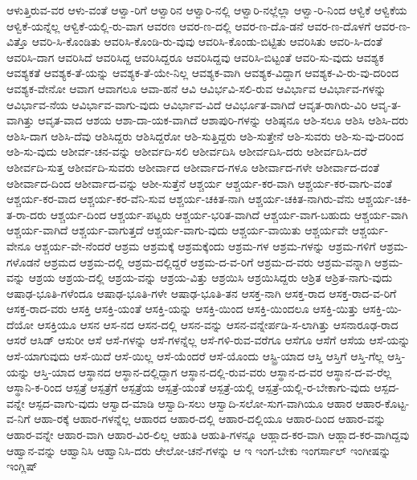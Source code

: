 {ಆಳುತ್ತಿರುವ-ವರ
ಆಳು-ವಂತೆ
ಆಳ್ವಾ-ರಿಗೆ
ಆಳ್ವಾರಿನ
ಆಳ್ವಾರಿ-ನಲ್ಲಿ
ಆಳ್ವಾರಿ-ನಲ್ಲೆಲ್ಲಾ
ಆಳ್ವಾ-ರಿ-ನಿಂದ
ಆಳ್ವಿಕೆ
ಆಳ್ವಿಕೆಯ
ಆಳ್ವಿಕೆ-ಯನ್ನೆಲ್ಲ
ಆಳ್ವಿಕೆ-ಯಲ್ಲಿ-ರು-ವಾಗ
ಆವರಣ
ಆವರ-ಣ-ದಲ್ಲಿ
ಆವರ-ಣ-ದೊ-ಡನೆ
ಆವರ-ಣ-ದೊಳಗೆ
ಆವರ-ಣ-ವಿತ್ತೊ
ಆವರಿ-ಸಿ-ಕೊಂಡಿತು
ಆವರಿಸಿ-ಕೊಂಡಿ-ರು-ವುವು
ಆವರಿಸಿ-ಕೊಂಡು-ಬಿಟ್ಟಿತು
ಆವರಿಸಿತು
ಆವರಿ-ಸಿ-ದಂತೆ
ಆವರಿಸಿ-ದಾಗ
ಆವರಿಸಿದೆ
ಆವರಿಸಿದ್ದ
ಆವರಿಸಿದ್ದರೂ
ಆವರಿಸಿದ್ದವು
ಆವರಿಸಿ-ಬಿಟ್ಟಂತೆ
ಆವರಿ-ಸು-ವುದು
ಆವಶ್ಯಕ
ಆವಶ್ಯಕತೆ
ಆವಶ್ಯಕ-ತೆ-ಯನ್ನು
ಆವಶ್ಯಕ-ತೆ-ಯೇ-ನಿಲ್ಲ
ಆವಶ್ಯಕ-ವಾಗಿ
ಆವಶ್ಯಕ-ವಿದ್ದಾಗ
ಆವಶ್ಯಕ-ವಿ-ರು-ವು-ದರಿಂದ
ಆವಶ್ಯಕ-ವೇನೋ
ಆವಾಗ
ಆವಾಗಲೂ
ಆವಾ-ಹನೆ
ಆವಿ
ಆವಿರ್ಭವಿ-ಸಲಿ-ರುವ
ಆವಿರ್ಭಾವ
ಆವಿರ್ಭಾವ-ಗಳನ್ನು
ಆವಿರ್ಭಾವ-ನೆಯ
ಆವಿರ್ಭಾವ-ವಾಗು-ವುದು
ಆವಿರ್ಭಾವ-ವಿದೆ
ಆವಿರ್ಭೂತ-ವಾಗಿದೆ
ಆವೃತ-ರಾಗಿರು-ವಿರಿ
ಆವೃ-ತ-ವಾಗಿತ್ತು
ಆವೃತ-ವಾದ
ಆಶಯ
ಆಶಾ-ದಾ-ಯಕ-ವಾಗಿದೆ
ಆಶಾಪುರಿ-ಗಳನ್ನು
ಆಶಿಷ್ಠನೂ
ಆಶಿ-ಸಲೂ
ಆಶಿಸಿ
ಆಶಿಸಿ-ದರು
ಆಶಿಸಿ-ದಾಗ
ಆಶಿಸಿ-ದೆವು
ಆಶಿಸಿದ್ದರು
ಆಶಿಸಿದ್ದರೋ
ಆಶಿ-ಸುತ್ತಿದ್ದರು
ಆಶಿ-ಸುತ್ತೇನೆ
ಆಶಿ-ಸುವರು
ಆಶಿ-ಸು-ವು-ದರಿಂದ
ಆಶಿ-ಸು-ವುದು
ಆಶೀರ್ವ-ಚನ-ವನ್ನು
ಆಶೀರ್ವದಿ-ಸಲಿ
ಆಶೀರ್ವದಿಸಿ
ಆಶೀರ್ವದಿಸಿ-ದರು
ಆಶೀರ್ವದಿಸಿ-ದರೆ
ಆಶೀರ್ವದಿ-ಸುತ್ತ
ಆಶೀರ್ವದಿ-ಸುವರು
ಆಶೀರ್ವಾದ
ಆಶೀರ್ವಾದ-ಗಳೂ
ಆಶೀರ್ವಾದ-ಗಳೇ
ಆಶೀರ್ವಾದ-ದಂತೆ
ಆಶೀರ್ವಾದ-ದಿಂದ
ಆಶೀರ್ವಾದ-ವನ್ನು
ಆಶೀ-ಸುತ್ತೆನೆ
ಆಶ್ಚರ್ಯ
ಆಶ್ಚರ್ಯ-ಕರ-ವಾಗಿ
ಆಶ್ಚರ್ಯ-ಕರ-ವಾಗು-ವಂತೆ
ಆಶ್ಚರ್ಯ-ಕರ-ವಾದ
ಆಶ್ಚರ್ಯ-ಕರ-ವೆನಿ-ಸುವ
ಆಶ್ಚರ್ಯ-ಚಕಿತ-ನಾಗಿ
ಆಶ್ಚರ್ಯ-ಚಕಿತ-ನಾಗಿರು-ವೆನು
ಆಶ್ಚರ್ಯ-ಚಕಿ-ತ-ರಾ-ದರು
ಆಶ್ಚರ್ಯ-ದಿಂದ
ಆಶ್ಚರ್ಯ-ಪಟ್ಟರು
ಆಶ್ಚರ್ಯ-ಭರಿತ-ವಾಗಿದೆ
ಆಶ್ಚರ್ಯ-ವಾಗ-ಬಹುದು
ಆಶ್ಚರ್ಯ-ವಾಗಿ
ಆಶ್ಚರ್ಯ-ವಾಗಿದೆ
ಆಶ್ಚರ್ಯ-ವಾಗುತ್ತದೆ
ಆಶ್ಚರ್ಯ-ವಾಗು-ವುದು
ಆಶ್ಚರ್ಯ-ವಾಯಿತು
ಆಶ್ಚರ್ಯವೇ
ಆಶ್ಚರ್ಯ-ವೇನೂ
ಆಶ್ಚರ್ಯ-ವೇ-ನೆಂದರೆ
ಆಶ್ರಮ
ಆಶ್ರಮಕ್ಕೆ
ಆಶ್ರಮಕ್ಕೆಂದು
ಆಶ್ರಮ-ಗಳ
ಆಶ್ರಮ-ಗಳನ್ನು
ಆಶ್ರಮ-ಗಳಿಗೆ
ಆಶ್ರಮ-ಗಳೊಡನೆ
ಆಶ್ರಮದ
ಆಶ್ರಮ-ದಲ್ಲಿ
ಆಶ್ರಮ-ದಲ್ಲಿದ್ದರೆ
ಆಶ್ರಮ-ದ-ವ-ರಿಗೆ
ಆಶ್ರಮ-ದ-ವರು
ಆಶ್ರಮ-ವನ್ನಾಗಿ
ಆಶ್ರಮ-ವನ್ನು
ಆಶ್ರಯ
ಆಶ್ರಯ-ದಲ್ಲಿ
ಆಶ್ರಯ-ವನ್ನು
ಆಶ್ರಯ-ವಿತ್ತು
ಆಶ್ರಯಿಸಿ
ಆಶ್ರಯಿಸಿದ್ದರು
ಆಶ್ರಿತ
ಆಶ್ರಿತ-ನಾಗು-ವುದು
ಆಷಾಢ-ಭೂತಿ-ಗಳೆಂದೂ
ಆಷಾಢ-ಭೂತಿ-ಗಳೇ
ಆಷಾಢ-ಭೂತಿ-ತನ
ಆಸಕ್ತ-ನಾಗಿ
ಆಸಕ್ತ-ರಾದ
ಆಸಕ್ತ-ರಾದ-ವ-ರಿಗೆ
ಆಸಕ್ತ-ರಾದ-ವರು
ಆಸಕ್ತಿ
ಆಸಕ್ತಿ-ಯಂತೆ
ಆಸಕ್ತಿ-ಯನ್ನು
ಆಸಕ್ತಿ-ಯಿಂದ
ಆಸಕ್ತಿ-ಯಿಂದಲೂ
ಆಸಕ್ತಿ-ಯಿತ್ತು
ಆಸಕ್ತಿ-ಯಿ-ದೆಯೋ
ಆಸಕ್ತಿಯೂ
ಆಸನ
ಆಸ-ನದ
ಆಸನ-ದಲ್ಲಿ
ಆಸನ-ವನ್ನು
ಆಸನ-ವನ್ನೇರ್ಪಡಿ-ಸ-ಲಾಗಿತ್ತು
ಆಸನಾರೂಢ-ರಾದ
ಆಸರೆ
ಆಸಿಡ್
ಆಸುರೀ
ಆಸೆ
ಆಸೆ-ಗಳನ್ನು
ಆಸೆ-ಗಳನ್ನೆಲ್ಲ
ಆಸೆ-ಗಳಿ-ರುವ-ವರೆಗೂ
ಆಸೆಗೂ
ಆಸೆಗೆ
ಆಸೆಯ
ಆಸೆ-ಯನ್ನು
ಆಸೆ-ಯಾಗುವುದು
ಆಸೆ-ಯಿದೆ
ಆಸೆ-ಯಿಲ್ಲ
ಆಸೆ-ಯೆಂದರೆ
ಆಸೆ-ಯೊಂದು
ಆಸ್ಟ್ರಿ-ಯಾದ
ಆಸ್ತಿ
ಆಸ್ತಿಗೆ
ಆಸ್ತಿ-ಗೆಲ್ಲ
ಆಸ್ತಿ-ಯನ್ನು
ಆಸ್ತಿ-ಯಾದ
ಆಸ್ಥಾನದ
ಆಸ್ಥಾನ-ದಲ್ಲಿದ್ದಾಗ
ಆಸ್ಥಾನ-ದಲ್ಲಿ-ರುವ-ವರು
ಆಸ್ಥಾನ-ದ-ವರ
ಆಸ್ಥಾನ-ದ-ವ-ರೆಲ್ಲ
ಆಸ್ಥಾನಿ-ಕ-ರಿಂದ
ಆಸ್ಪತ್ರೆ
ಆಸ್ಪತ್ರೆಗೆ
ಆಸ್ಪತ್ರೆಯ
ಆಸ್ಪತ್ರೆ-ಯಂತೆ
ಆಸ್ಪತ್ರೆ-ಯಲ್ಲಿ
ಆಸ್ಪತ್ರೆ-ಯಲ್ಲಿ-ರ-ಬೇಕಾಗು-ವುದು
ಆಸ್ಪದ-ವನ್ನೇ
ಆಸ್ಪದ-ವಾಗು-ವುದು
ಆಸ್ವಾದ-ಮಾಡಿ
ಆಸ್ವಾದಿ-ಸಲು
ಆಸ್ವಾದಿ-ಸಲೋ-ಸುಗ-ವಾಗಿಯೂ
ಆಹಾರ
ಆಹಾರ-ಕೊಟ್ಟ-ವ-ನಿಗೆ
ಆಹಾ-ರಕ್ಕೆ
ಆಹಾರ-ಗಳನ್ನೆಲ್ಲ
ಆಹಾರದ
ಆಹಾರ-ದಲ್ಲಿ
ಆಹಾರ-ದಲ್ಲಿಯೂ
ಆಹಾರ-ದಿಂದ
ಆಹಾರ-ವನ್ನು
ಆಹಾರ-ವನ್ನೇ
ಆಹಾರ-ವಾಗಿ
ಆಹಾರ-ವಿರ-ಲಿಲ್ಲ
ಆಹುತಿ
ಆಹುತಿ-ಗಳನ್ನೂ
ಆಹ್ಲಾದ-ಕರ-ವಾಗಿ
ಆಹ್ಲಾದ-ಕರ-ವಾಗಿದ್ದವು
ಆಹ್ವಾನ-ವನ್ನು
ಆಹ್ವಾನಿಸಿ
ಆಹ್ವಾನಿಸಿ-ದರು
ಆೇಲೋ-ಚನೆ-ಗಳನ್ನು
ಆ
ಇ
ಇಂಗ-ಬೇಕು
ಇಂಗರ್ಸಾಲ್
ಇಂಗೀಷನ್ನು
ಇಂಗ್ಲಿಷ್
}
